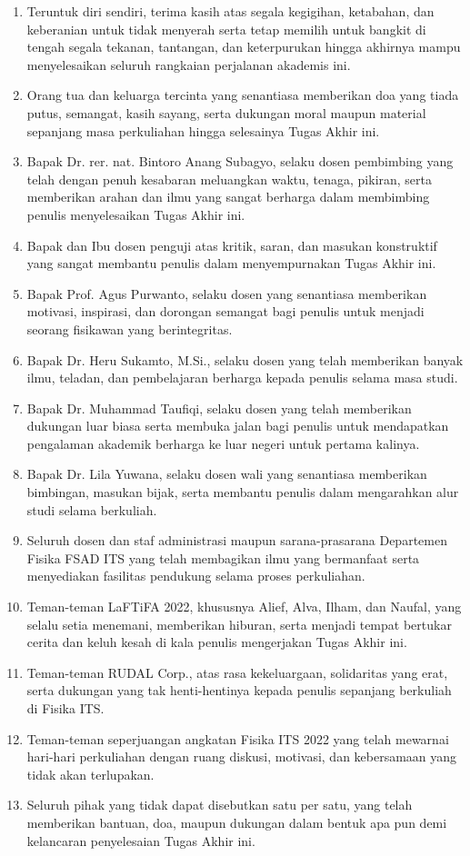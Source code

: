 \begin{enumerate}[label=\arabic*.]
	\item Teruntuk diri sendiri, terima kasih atas segala kegigihan, ketabahan, dan keberanian untuk tidak menyerah serta tetap memilih untuk bangkit di tengah segala tekanan, tantangan, dan keterpurukan hingga akhirnya mampu menyelesaikan seluruh rangkaian perjalanan akademis ini.
    \item Orang tua dan keluarga tercinta yang senantiasa memberikan doa yang tiada putus, semangat, kasih sayang, serta dukungan moral maupun material sepanjang masa perkuliahan hingga selesainya Tugas Akhir ini.
    \item Bapak Dr. rer. nat. Bintoro Anang Subagyo, selaku dosen pembimbing yang telah dengan penuh kesabaran meluangkan waktu, tenaga, pikiran, serta memberikan arahan dan ilmu yang sangat berharga dalam membimbing penulis menyelesaikan Tugas Akhir ini.
    \item Bapak dan Ibu dosen penguji atas kritik, saran, dan masukan konstruktif yang sangat membantu penulis dalam menyempurnakan Tugas Akhir ini.
    \item Bapak Prof. Agus Purwanto, selaku dosen yang senantiasa memberikan motivasi, inspirasi, dan dorongan semangat bagi penulis untuk menjadi seorang fisikawan yang berintegritas.
    \item Bapak Dr. Heru Sukamto, M.Si., selaku dosen yang telah memberikan banyak ilmu, teladan, dan pembelajaran berharga kepada penulis selama masa studi.
    \item Bapak Dr. Muhammad Taufiqi, selaku dosen yang telah memberikan dukungan luar biasa serta membuka jalan bagi penulis untuk mendapatkan pengalaman akademik berharga ke luar negeri untuk pertama kalinya.
    \item Bapak Dr. Lila Yuwana, selaku dosen wali yang senantiasa memberikan bimbingan, masukan bijak, serta membantu penulis dalam mengarahkan alur studi selama berkuliah.
    \item Seluruh dosen dan staf administrasi maupun sarana-prasarana Departemen Fisika FSAD ITS yang telah membagikan ilmu yang bermanfaat serta menyediakan fasilitas pendukung selama proses perkuliahan.
    \item Teman-teman LaFTiFA 2022, khususnya Alief, Alva, Ilham, dan Naufal, yang selalu setia menemani, memberikan hiburan, serta menjadi tempat bertukar cerita dan keluh kesah di kala penulis mengerjakan Tugas Akhir ini.
    \item Teman-teman RUDAL Corp., atas rasa kekeluargaan, solidaritas yang erat, serta dukungan yang tak henti-hentinya kepada penulis sepanjang berkuliah di Fisika ITS.
    \item Teman-teman seperjuangan angkatan Fisika ITS 2022 yang telah mewarnai hari-hari perkuliahan dengan ruang diskusi, motivasi, dan kebersamaan yang tidak akan terlupakan.
    \item Seluruh pihak yang tidak dapat disebutkan satu per satu, yang telah memberikan bantuan, doa, maupun dukungan dalam bentuk apa pun demi kelancaran penyelesaian Tugas Akhir ini.
\end{enumerate}
